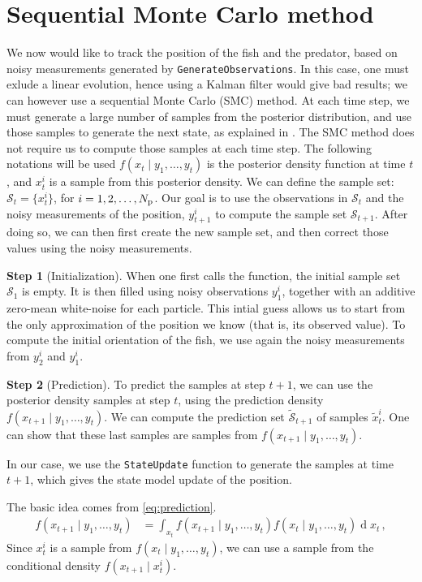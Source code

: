 \documentclass[final]{aomart}
\newtheorem[{}\it]{thm}{Theorem}[section]
\theoremstyle{definition}
\newtheorem*[{}\it]{notation}{Notation}
\newtheorem{step}{Step}
\numberwithin{equation}{section}
\newcommand{\np}{N_\textnormal{p}}
\newcommand{\sset}{\mathcal{S}}
\newcommand{\pdf}{f} %
\DeclareMathOperator{\newdiff}{d} %
\newcommand{\dif}{\newdiff\!} %
\begin{document}
\section{Sequential Monte Carlo method}
\label{sec:mcfilter}
We now would like to track the position of the fish and the predator, based on noisy measurements generated by \texttt{GenerateObservations}.
In this case, one must exlude a linear evolution, hence using a Kalman filter would give bad results; we can however use a sequential Monte Carlo  (SMC) method.
At each time step, we must generate a large number of samples from the posterior distribution, and use those samples to generate the next state,
as explained in \cite{filter}.
The SMC method does not require us to compute those samples at each time step.
The following notations will be used \(\pdf(x_t \mid y_1, \ldots ,y_t)\) is the posterior density function at time $t$, and \(x_t^i\) is a sample from this posterior density.
We can define the sample set: \(\sset_t = \{x_t^i\}\), for \(i = 1,2,\ldots,\np\).
Our goal is to use the observations in \(\sset_t\) and the noisy measurements of the position, \(y_{t+1}^i\) to compute the sample set \(\sset_{t+1}\).
After doing so, we can then first create the new sample set, and then correct those values using the noisy measurements.

\begin{step}[Initialization]
When one first calls the function, the initial sample set \(\sset_1\) is empty.
It is then filled using noisy observations \(y_1^i\), together with an additive zero-mean white-noise for each particle.
This intial guess allows us to start from the only approximation of the position we know (that is, its observed value).
To compute the initial orientation of the fish, we use again the noisy measurements from \(y_2^i\) and \(y_1^i\).
\end{step}

\begin{step}[Prediction]
To predict the samples at step \(t+1\), we can use the posterior density samples at step \(t\), using the prediction density \(\pdf(x_{t+1} \mid y_1,\ldots,y_t)\).
We can compute the prediction set \(\tilde{\sset}_{t+1}\) of samples \(\tilde{x}_t^i \).
One can show that these last samples are samples from \(\pdf(x_{t+1} \mid y_1,\ldots,y_t)\). \cite{anuj ref 5}

In our case, we use the \texttt{StateUpdate} function to generate the samples at time \(t+1\), which gives the state model update of the position.

The basic idea comes from \eqref{eq:prediction}.
\begin{align}
	\pdf(x_{t+1} \mid y_1, \ldots, y_t) &= \int_{x_t}  \pdf(x_{t+1} \mid y_1, \ldots, y_t) \pdf(x_t \mid y_1,\ldots,y_t) \dif x_t\,,
	\label{eq:prediction}
\end{align}
Since \(x_t^i\) is a sample from \(\pdf(x_t \mid y_1, \ldots, y_t)\), we can use a sample from the conditional density \(\pdf(x_{t+1} \mid x_t^i)\).
\end{step}
\end{document}
